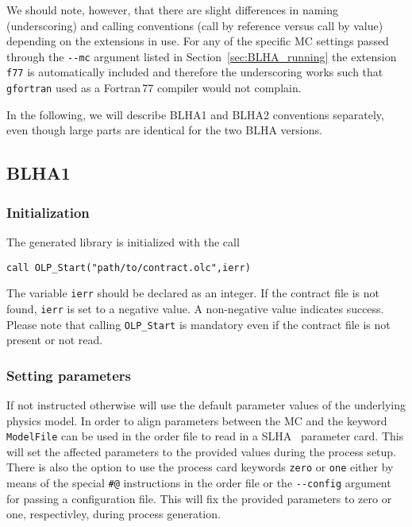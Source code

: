 We should note, however, that there are slight differences in naming (underscoring) and calling conventions (call by reference versus call by value) depending on the extensions in use. For any of the specific MC settings passed through the \lstinline[style=sh]|--mc| argument listed in Section~\ref{sec:BLHA_running} the extension \texttt{f77} is automatically included and therefore the underscoring works such that \texttt{gfortran} used as a Fortran\,77 compiler would not complain.

In the following, we will describe BLHA1 and BLHA2 conventions separately, even though large parts are identical for the two BLHA versions.

%
%
%

\subsection{BLHA1}

\subsubsection{Initialization}
The generated \gosam{} library is initialized with the call
\begin{lstlisting}[style=fortran]
      call OLP_Start("path/to/contract.olc",ierr)
\end{lstlisting}
The variable \texttt{ierr} should be declared as an integer. If the contract file is not found, \texttt{ierr} is set to a negative value. A non-negative value indicates success. Please note that calling \texttt{OLP\_Start} is mandatory even if the contract file is not present or not read.


\subsubsection{Setting parameters}
If not instructed otherwise \gosam will use the default parameter values of the underlying physics model. In order to align parameters between the MC and \gosam the keyword \texttt{ModelFile} can be used in the order file to read in a SLHA~\cite{Skands:2003cj,Allanach:2008qq} parameter card. This will set the affected parameters to the provided values during the process setup. There is also the option to use the process card keywords \texttt{zero} or \texttt{one} either by means of the special \texttt{\#@} instructions in the order file or the \lstinline[style=sh]|--config| argument for passing a configuration file. This will fix the provided parameters to zero or one, respectivley, during process generation.

